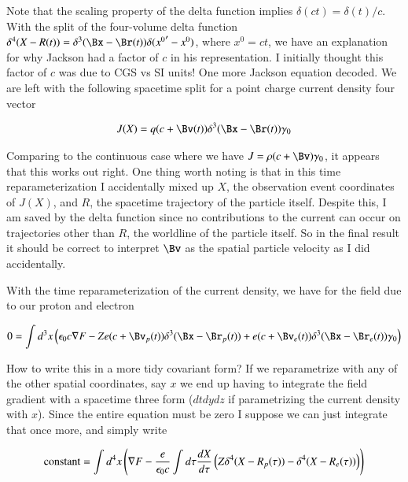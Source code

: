 Note that the scaling property of the delta function implies $\delta(c t) = \delta(t)/c$.  With the split of the four-volume delta function $\delta^4(X - R(t)) = \delta^3(\Bx - \Br(t)) \delta( {x^0}' - x^0 )$, where $x^0 = c t$, we have an explanation for why Jackson had a factor of $c$ in his representation.  I initially thought this factor of $c$ was due to CGS vs SI units!  One more Jackson equation decoded.  We are left with the following spacetime split for a point charge current density four vector

\begin{align}\label{eqn:nuclearInteraction:boo11}
J(X) 
= q (c + \Bv(t))\delta^3 (\Bx - \Br(t)) \gamma_0 
\end{align}

Comparing to the continuous case where we have $J = \rho ( c + \Bv ) \gamma_0$, it appears that this works out right.  One thing worth noting is that in this time reparameterization I accidentally mixed up $X$, the observation event coordinates of $J(X)$, and $R$, the spacetime trajectory of the particle itself.  Despite this, I am saved by the delta function since no contributions to the current can occur on trajectories other than $R$, the worldline of the particle itself.  So in the final result it should be correct to interpret $\Bv$ as the spatial particle velocity as I did accidentally.

With the time reparameterization of the current density, we have for the field due to our proton and electron

\begin{align}\label{eqn:nuclearInteraction:boo8}
0 = \int d^3 x \left( \epsilon_0 c \grad F - Z e (c + \Bv_p(t))\delta^3 (\Bx - \Br_p(t)) + e (c + \Bv_e(t))\delta^3 (\Bx - \Br_e(t)) \gamma_0 \right)
\end{align}

How to write this in a more tidy covariant form?  If we reparametrize with any of the other spatial coordinates, say $x$ we end up having to integrate the field gradient with a spacetime three form ($dt dy dz$ if parametrizing the current density with $x$).  Since the entire equation must be zero I suppose we can just integrate that once more, and simply write

\begin{align}\label{eqn:nuclearInteraction:boo9}
\text{constant} = \int d^4 x \left( \nabla F - \frac{e}{\epsilon_0 c}\int d\tau \frac{dX}{d\tau} \left( Z \delta^4 (X - R_p(\tau)) - \delta^4 (X - R_e(\tau)) \right) \right)
\end{align}

